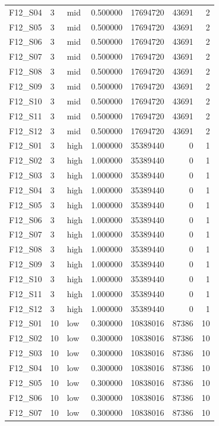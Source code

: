 \begin{longtable}{lllr r r r}
F12\_S04 & 3 & mid & 0.500000 & 17694720 & 43691 & 2 \\
F12\_S05 & 3 & mid & 0.500000 & 17694720 & 43691 & 2 \\
F12\_S06 & 3 & mid & 0.500000 & 17694720 & 43691 & 2 \\
F12\_S07 & 3 & mid & 0.500000 & 17694720 & 43691 & 2 \\
F12\_S08 & 3 & mid & 0.500000 & 17694720 & 43691 & 2 \\
F12\_S09 & 3 & mid & 0.500000 & 17694720 & 43691 & 2 \\
F12\_S10 & 3 & mid & 0.500000 & 17694720 & 43691 & 2 \\
F12\_S11 & 3 & mid & 0.500000 & 17694720 & 43691 & 2 \\
F12\_S12 & 3 & mid & 0.500000 & 17694720 & 43691 & 2 \\
F12\_S01 & 3 & high & 1.000000 & 35389440 & 0 & 1 \\
F12\_S02 & 3 & high & 1.000000 & 35389440 & 0 & 1 \\
F12\_S03 & 3 & high & 1.000000 & 35389440 & 0 & 1 \\
F12\_S04 & 3 & high & 1.000000 & 35389440 & 0 & 1 \\
F12\_S05 & 3 & high & 1.000000 & 35389440 & 0 & 1 \\
F12\_S06 & 3 & high & 1.000000 & 35389440 & 0 & 1 \\
F12\_S07 & 3 & high & 1.000000 & 35389440 & 0 & 1 \\
F12\_S08 & 3 & high & 1.000000 & 35389440 & 0 & 1 \\
F12\_S09 & 3 & high & 1.000000 & 35389440 & 0 & 1 \\
F12\_S10 & 3 & high & 1.000000 & 35389440 & 0 & 1 \\
F12\_S11 & 3 & high & 1.000000 & 35389440 & 0 & 1 \\
F12\_S12 & 3 & high & 1.000000 & 35389440 & 0 & 1 \\
F12\_S01 & 10 & low & 0.300000 & 10838016 & 87386 & 10 \\
F12\_S02 & 10 & low & 0.300000 & 10838016 & 87386 & 10 \\
F12\_S03 & 10 & low & 0.300000 & 10838016 & 87386 & 10 \\
F12\_S04 & 10 & low & 0.300000 & 10838016 & 87386 & 10 \\
F12\_S05 & 10 & low & 0.300000 & 10838016 & 87386 & 10 \\
F12\_S06 & 10 & low & 0.300000 & 10838016 & 87386 & 10 \\
F12\_S07 & 10 & low & 0.300000 & 10838016 & 87386 & 10 \\

\end{longtable}
